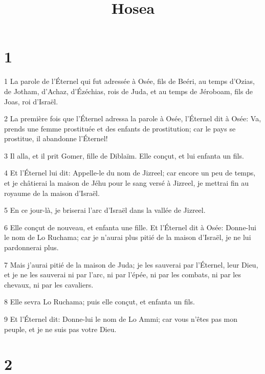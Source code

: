 

\title{Hosea}


\chapter{1}

\par 1 La parole de l'Éternel qui fut adressée à Osée, fils de Beéri, au temps d'Ozias, de Jotham, d'Achaz, d'Ézéchias, rois de Juda, et au temps de Jéroboam, fils de Joas, roi d'Israël.
\par 2 La première fois que l'Éternel adressa la parole à Osée, l'Éternel dit à Osée: Va, prends une femme prostituée et des enfants de prostitution; car le pays se prostitue, il abandonne l'Éternel!
\par 3 Il alla, et il prit Gomer, fille de Diblaïm. Elle conçut, et lui enfanta un fils.
\par 4 Et l'Éternel lui dit: Appelle-le du nom de Jizreel; car encore un peu de temps, et je châtierai la maison de Jéhu pour le sang versé à Jizreel, je mettrai fin au royaume de la maison d'Israël.
\par 5 En ce jour-là, je briserai l'arc d'Israël dans la vallée de Jizreel.
\par 6 Elle conçut de nouveau, et enfanta une fille. Et l'Éternel dit à Osée: Donne-lui le nom de Lo Ruchama; car je n'aurai plus pitié de la maison d'Israël, je ne lui pardonnerai plus.
\par 7 Mais j'aurai pitié de la maison de Juda; je les sauverai par l'Éternel, leur Dieu, et je ne les sauverai ni par l'arc, ni par l'épée, ni par les combats, ni par les chevaux, ni par les cavaliers.
\par 8 Elle sevra Lo Ruchama; puis elle conçut, et enfanta un fils.
\par 9 Et l'Éternel dit: Donne-lui le nom de Lo Ammi; car vous n'êtes pas mon peuple, et je ne suis pas votre Dieu.

\chapter{2}


